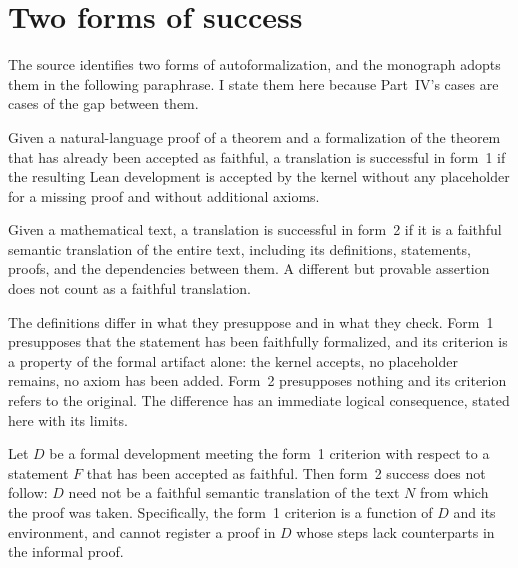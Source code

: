 \section{Two forms of success}

The source identifies two forms of autoformalization, and the monograph adopts them in the following paraphrase. I state them here because Part~IV's cases are cases of the gap between them.

\begin{definition}
\label{def:form1}
Given a natural-language proof of a theorem and a formalization of the theorem that has already been accepted as faithful, a translation is successful in form~1 if the resulting Lean development is accepted by the kernel without any placeholder for a missing proof and without additional axioms.
\end{definition}

\begin{definition}
\label{def:form2}
Given a mathematical text, a translation is successful in form~2 if it is a faithful semantic translation of the entire text, including its definitions, statements, proofs, and the dependencies between them. A different but provable assertion does not count as a faithful translation.
\end{definition}

The definitions differ in what they presuppose and in what they check. Form~1 presupposes that the statement has been faithfully formalized, and its criterion is a property of the formal artifact alone: the kernel accepts, no placeholder remains, no axiom has been added. Form~2 presupposes nothing and its criterion refers to the original. The difference has an immediate logical consequence, stated here with its limits.

\begin{proposition}
\label{prop:form12}
Let $D$ be a formal development meeting the form~1 criterion with respect to a statement $F$ that has been accepted as faithful. Then form~2 success does not follow: $D$ need not be a faithful semantic translation of the text $N$ from which the proof was taken. Specifically, the form~1 criterion is a function of $D$ and its environment, and cannot register a proof in $D$ whose steps lack counterparts in the informal proof.
\end{proposition}

